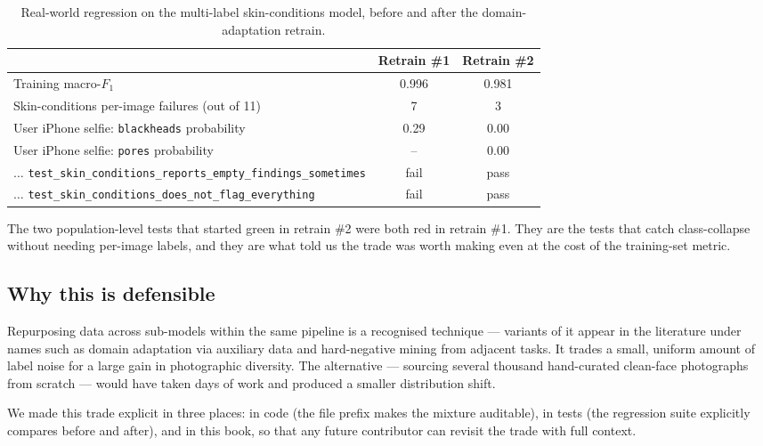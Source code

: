 \documentclass[11pt,a4paper,oneside]{report}
\begin{document}
\begin{table}[htbp]
    \centering
    \caption{Real-world regression on the multi-label skin-conditions
    model, before and after the domain-adaptation retrain.}
    \label{tab:regression-cond}
    \small
    \begin{tabular}{lcc}
        \toprule
        & \textbf{Retrain \#1} & \textbf{Retrain \#2} \\
        \midrule
        Training macro-\(F_1\) & 0.996 & 0.981 \\
        Skin-conditions per-image failures (out of 11) & 7 & 3 \\
        User iPhone selfie: \texttt{blackheads} probability & 0.29 & 0.00 \\
        User iPhone selfie: \texttt{pores} probability     & --   & 0.00 \\
        \(\ldots\) \texttt{test\_skin\_conditions\_reports\_empty\_findings\_sometimes} & fail & pass \\
        \(\ldots\) \texttt{test\_skin\_conditions\_does\_not\_flag\_everything}         & fail & pass \\
        \bottomrule
    \end{tabular}
\end{table}

The two population-level tests that started green in retrain \#2
were both red in retrain \#1. They are the tests that catch
class-collapse without needing per-image labels, and they are what
told us the trade was worth making even at the cost of the
training-set metric.

\subsection{Why this is defensible}

Repurposing data across sub-models within the same pipeline is a
recognised technique --- variants of it appear in the literature
under names such as domain adaptation via auxiliary data and
hard-negative mining from adjacent tasks. It trades a small,
uniform amount of label noise for a large gain in photographic
diversity. The alternative --- sourcing several thousand
hand-curated clean-face photographs from scratch --- would have
taken days of work and produced a smaller distribution shift.

We made this trade explicit in three places: in code (the file
prefix makes the mixture auditable), in tests (the
regression suite explicitly compares before and after), and in
this book, so that any future contributor can revisit the trade
with full context.
\end{document}
